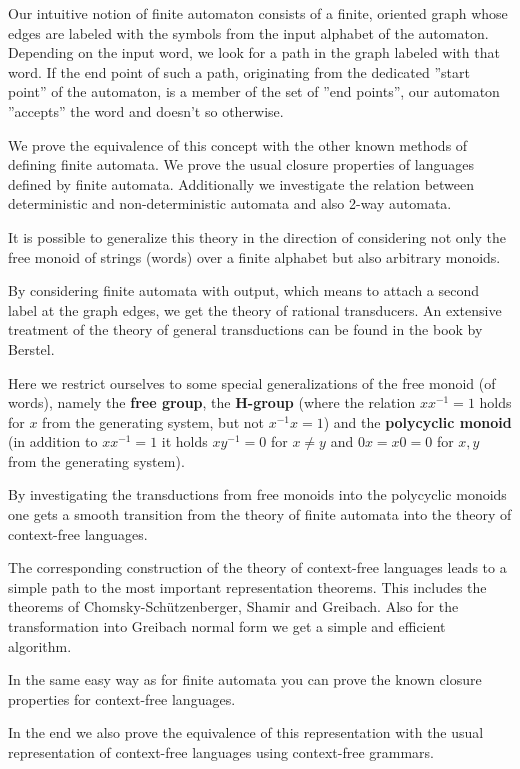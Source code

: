Our intuitive notion of finite automaton consists of a finite, oriented graph whose 
edges are labeled with the symbols from the input alphabet of the automaton. 
Depending on the input word, we look for a path in the graph labeled with that
word. If the end point of such a path, originating from the dedicated ''start point'' 
of the automaton, is a member of the set of ''end points'', our automaton
''accepts'' the word and doesn't so otherwise.

We prove the equivalence of this concept with the other known methods of
defining finite automata. We prove the usual closure properties of languages
defined by finite automata. Additionally we investigate the relation between
deterministic and non-deterministic automata and also 2-way automata.

It is possible to generalize this theory in the direction of considering not
only the free monoid of strings (words) over a finite alphabet but also
arbitrary monoids.

By considering finite automata with output, which means to attach a second label
at the graph edges, we get the theory of rational transducers. An extensive
treatment of the theory of general transductions can be found in the book by
Berstel.

Here we restrict ourselves to some special generalizations of the free monoid
(of words), namely the {\bf free group}, the {\bf H-group} (where the relation
$x x^{-1} = 1$ holds for $x$ from the generating system, but not $x^{-1} x = 1$) and the
{\bf polycyclic monoid} (in addition to $x x^{-1} = 1$ it holds $x y^{-1} = 0$
for $x \neq y$ and $0 x = x 0 = 0$ for $x,y$ from the generating system).

By investigating the transductions from free monoids into the polycyclic
monoids one gets a smooth transition from the theory of finite automata into the
theory of context-free languages.

The corresponding construction of the theory of context-free languages leads to
a simple path to the most important representation theorems. This includes the
theorems of Chomsky-Schützenberger, Shamir and Greibach. Also for the
transformation into Greibach normal form we get a simple and efficient
algorithm.

In the same easy way as for finite automata you can prove the known closure
properties for context-free languages.

In the end we also prove the equivalence of this representation with the usual
representation of context-free languages using context-free grammars.

